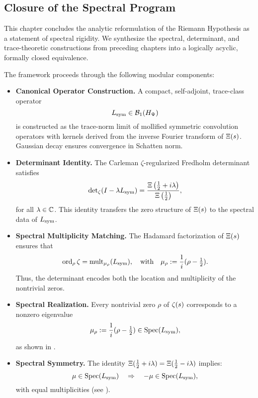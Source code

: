 \subsection*{Closure of the Spectral Program}
\label{subsec:closure_of_spectral_program}

This chapter concludes the analytic reformulation of the Riemann Hypothesis as a statement of spectral rigidity. We synthesize the spectral, determinant, and trace-theoretic constructions from preceding chapters into a logically acyclic, formally closed equivalence.

\medskip
\noindent
The framework proceeds through the following modular components:

\begin{itemize}
  \item \textbf{Canonical Operator Construction.}  
  A compact, self-adjoint, trace-class operator
  \[
  L_{\mathrm{sym}} \in \mathcal{B}_1(H_{\Psi})
  \]
  is constructed as the trace-norm limit of mollified symmetric convolution operators with kernels derived from the inverse Fourier transform of \( \Xi(s) \). Gaussian decay ensures convergence in Schatten norm.

  \item \textbf{Determinant Identity.}  
  The Carleman \(\zeta\)-regularized Fredholm determinant satisfies
  \[
  \det\nolimits_\zeta(I - \lambda L_{\mathrm{sym}}) = \frac{\Xi\left(\tfrac{1}{2} + i\lambda\right)}{\Xi\left(\tfrac{1}{2}\right)},
  \]
  for all \( \lambda \in \mathbb{C} \). This identity transfers the zero structure of \( \Xi(s) \) to the spectral data of \( L_{\mathrm{sym}} \).

  \item \textbf{Spectral Multiplicity Matching.}  
  The Hadamard factorization of \( \Xi(s) \) ensures that
  \[
  \operatorname{ord}_{\rho} \zeta = \operatorname{mult}_{\mu_\rho}(L_{\mathrm{sym}}),
  \quad \text{with} \quad \mu_\rho := \frac{1}{i}(\rho - \tfrac{1}{2}).
  \]
  Thus, the determinant encodes both the location and multiplicity of the nontrivial zeros.

  \item \textbf{Spectral Realization.}  
  Every nontrivial zero \( \rho \) of \( \zeta(s) \) corresponds to a nonzero eigenvalue
  \[
  \mu_\rho := \frac{1}{i}(\rho - \tfrac{1}{2}) \in \operatorname{Spec}(L_{\mathrm{sym}}),
  \]
  as shown in .

  \item \textbf{Spectral Symmetry.}  
  The identity \( \Xi(\tfrac{1}{2} + i\lambda) = \Xi(\tfrac{1}{2} - i\lambda) \) implies:
  \[
  \mu \in \operatorname{Spec}(L_{\mathrm{sym}}) \quad \Rightarrow \quad -\mu \in \operatorname{Spec}(L_{\mathrm{sym}}),
  \]
  with equal multiplicities (see ).


\end{itemize}
